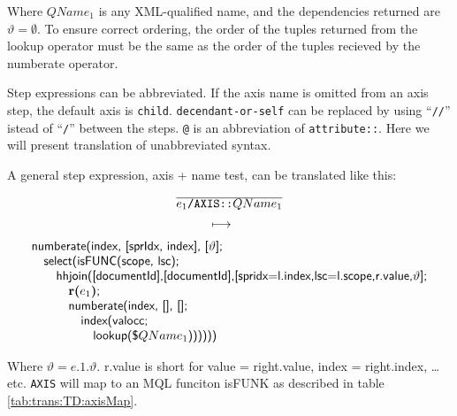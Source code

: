 Where $QName_1$ is any XML-qualified name, and the dependencies returned are $\vartheta = \emptyset$. To ensure
correct ordering, the order of the tuples returned from the \textsf{lookup} operator must be the same as the order
of the tuples recieved by the \textsf{numberate} operator. 

Step expressions can be abbreviated. If the axis name is omitted from an axis step, the default axis is
\texttt{child}. \texttt{decendant-or-self} can be replaced by using ``\texttt{//}'' istead of ``\texttt{/}''
between the steps. \texttt{@} is an abbreviation of \texttt{attribute::}. Here we will present translation of
unabbreviated syntax.

A general step expression, axis + name test, can be translated like this:
\begin{equation}
\begin{array}{c}
\frac{}{\displaystyle e_{1}\texttt{/AXIS::}QName_1} \\ 
\longmapsto \begin{array}{c}\mbox{\tiny } \\ \mbox{\tiny } \end{array} \\
\begin{array}{l}
\mbox{\textsf{numberate(index, [sprIdx, index], [}}\vartheta\mbox{\textsf{];}} \\ \quad
\mbox{\textsf{select(isFUNC(scope, lsc);}} \\ \quad \quad
\mbox{\textsf{hhjoin([documentId],[documentId],[spridx=l.index,lsc=l.scope,r.value,}}\vartheta\mbox{\textsf{];}}\\ \quad \quad \quad 
\mbox{\textbf{r(}}e_1\mbox{\textbf{)}\textsf{;}} \\ \quad \quad\quad
\mbox{\textsf{numberate(index, [], [];}}\\ \quad \quad\quad\quad
\mbox{\textsf{index(valocc;}} \\ \quad\quad\quad\quad\quad
\mbox{\textsf{lookup(\$}}QName_1\mbox{\textsf{))))))}}
\end{array}
\end{array}
\label{rule:trans:TD:pathStep}
\end{equation}

Where $\vartheta = e.1.\vartheta$. \textsf{r.value} is short for \textsf{value = right.value, index = right.index,
\ldots etc}. \texttt{AXIS} will map to an MQL funciton \textsf{isFUNK} as described in table \ref{tab:trans:TD:axisMap}. 

